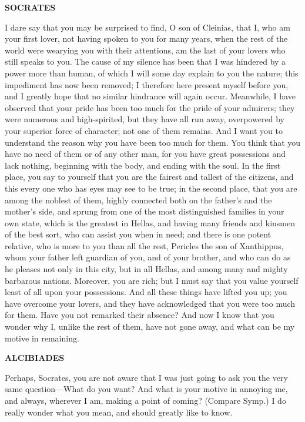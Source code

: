 \documentclass[11pt,letter]{article}
\begin{document}
\par \textbf{SOCRATES}
\par   I dare say that you may be surprised to find, O son of Cleinias, that I, who am your first lover, not having spoken to you for many years, when the rest of the world were wearying you with their attentions, am the last of your lovers who still speaks to you. The cause of my silence has been that I was hindered by a power more than human, of which I will some day explain to you the nature; this impediment has now been removed; I therefore here present myself before you, and I greatly hope that no similar hindrance will again occur. Meanwhile, I have observed that your pride has been too much for the pride of your admirers; they were numerous and high-spirited, but they have all run away, overpowered by your superior force of character; not one of them remains. And I want you to understand the reason why you have been too much for them. You think that you have no need of them or of any other man, for you have great possessions and lack nothing, beginning with the body, and ending with the soul. In the first place, you say to yourself that you are the fairest and tallest of the citizens, and this every one who has eyes may see to be true; in the second place, that you are among the noblest of them, highly connected both on the father's and the mother's side, and sprung from one of the most distinguished families in your own state, which is the greatest in Hellas, and having many friends and kinsmen of the best sort, who can assist you when in need; and there is one potent relative, who is more to you than all the rest, Pericles the son of Xanthippus, whom your father left guardian of you, and of your brother, and who can do as he pleases not only in this city, but in all Hellas, and among many and mighty barbarous nations. Moreover, you are rich; but I must say that you value yourself least of all upon your possessions. And all these things have lifted you up; you have overcome your lovers, and they have acknowledged that you were too much for them. Have you not remarked their absence? And now I know that you wonder why I, unlike the rest of them, have not gone away, and what can be my motive in remaining.

\par \textbf{ALCIBIADES}
\par   Perhaps, Socrates, you are not aware that I was just going to ask you the very same question—What do you want? And what is your motive in annoying me, and always, wherever I am, making a point of coming? (Compare Symp.) I do really wonder what you mean, and should greatly like to know.
\end{document}
